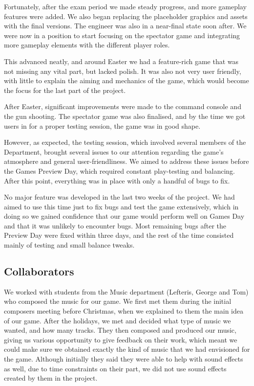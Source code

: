 \documentclass[a4paper,11pt]{article}
\begin{document}
Fortunately, after the exam period we made steady progress, and more gameplay features were added. We also began replacing the placeholder graphics and assets with the final versions. The engineer was also in a near-final state soon after. We were now in a position to start focusing on the spectator game and integrating more gameplay elements with the different player roles.

This advanced neatly, and around Easter we had a feature-rich game that was not missing any vital part, but lacked polish. It was also not very user friendly, with little to explain the aiming and mechanics of the game, which would become the focus for the last part of the project.

After Easter, significant improvements were made to the command console and the gun shooting. The spectator game was also finalised, and by the time we got users in for a proper testing session, the game was in good shape.

However, as expected, the testing session, which involved several members of the Department, brought several issues to our attention regarding the game’s atmosphere and general user-friendliness. We aimed to address these issues before the Games Preview Day, which required constant play-testing and balancing. After this point, everything was in place with only a handful of bugs to fix.


No major feature was developed in the last two weeks of the project. We had aimed to use this time just to fix bugs and test the game extensively, which in doing so we gained confidence that our game would perform well on Games Day and that it was unlikely to encounter bugs. Most remaining bugs after the Preview Day were fixed within three days, and the rest of the time consisted mainly of testing and small balance tweaks.


\subsection{Collaborators}
We worked with students from the Music department (Lefteris, George and Tom) who composed the music for our game. We first met them during the initial composers meeting before Christmas, when we explained to them the main idea of our game. After the holidays, we met and decided what type of music we wanted, and how many tracks. They then composed and produced our music, giving us various opportunity to give feedback on their work, which meant we could make sure we obtained exactly the kind of music that we had envisioned for the game. Although initially they said they were able to help with sound effects as well, due to time constraints on their part, we did not use sound effects created by them in the project. 
\end{document}
